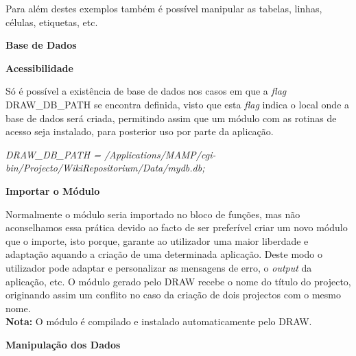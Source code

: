\documentclass[a4paper]{article}
\begin{document}
\hspace{1cm}Para além destes exemplos também é possível manipular as tabelas, linhas, células, etiquetas, etc.\\

\begin{large}
\textbf{Base de Dados}\\
\end{large}

\begin{normalsize}
\textbf{Acessibilidade}\\
\end{normalsize}

\hspace{1cm}Só é possível a existência de base de dados nos casos em que a \emph{flag} DRAW\_DB\_PATH se encontra definida, visto que
esta \emph{flag} indica o local onde a base de dados será criada, permitindo assim que um módulo com as rotinas de acesso seja instalado,
para posterior uso por parte da aplicação.

\begin{center}
\begin{small}
\emph{DRAW\_DB\_PATH = /Applications/MAMP/cgi-bin/Projecto/WikiRepositorium/Data/mydb.db;}
\end{small}
\end{center}

\begin{normalsize}
\textbf{Importar o Módulo}\\
\end{normalsize}

\hspace{1cm}Normalmente o módulo seria importado no bloco de funções, mas não aconselhamos essa prática devido ao facto de ser
preferível criar um novo módulo que o importe, isto porque, garante ao utilizador uma maior liberdade e adaptação aquando a criação de
uma determinada aplicação. Deste modo o utilizador pode adaptar e personalizar as mensagens de erro, o \emph{output} da aplicação, etc.
O módulo gerado pelo DRAW recebe o nome do título do projecto, originando assim um conflito no caso da criação de dois projectos com o
mesmo nome.\\

\textbf{Nota:} O módulo é compilado e instalado automaticamente pelo DRAW.\\

\begin{normalsize}
\textbf{Manipulação dos Dados}\\
\end{normalsize}
\end{document}
